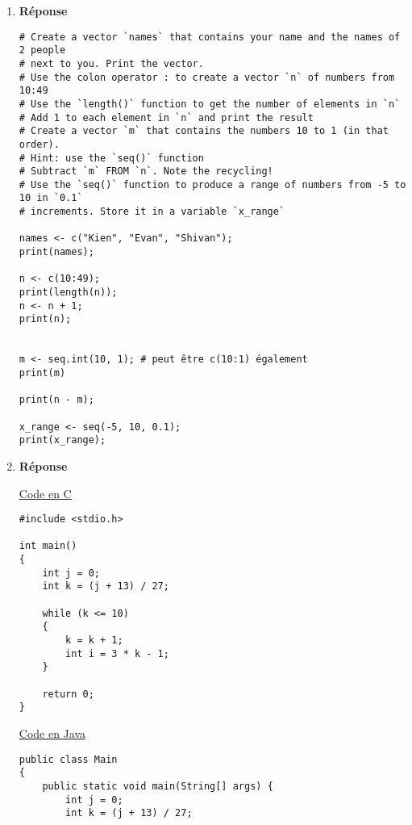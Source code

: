 \documentclass[12pt]{book}
\begin{document}
\newcommand{\reporttitle}{Devoir 3}
\newcommand{\reportauthorOne}{Kien Do}
\newcommand{\cidOne}{300163370}






\begin{enumerate}
    \item \textbf{Réponse}
\begin{verbatim}
# Create a vector `names` that contains your name and the names of 2 people
# next to you. Print the vector.
# Use the colon operator : to create a vector `n` of numbers from 10:49
# Use the `length()` function to get the number of elements in `n`
# Add 1 to each element in `n` and print the result
# Create a vector `m` that contains the numbers 10 to 1 (in that order).
# Hint: use the `seq()` function
# Subtract `m` FROM `n`. Note the recycling!
# Use the `seq()` function to produce a range of numbers from -5 to 10 in `0.1`
# increments. Store it in a variable `x_range`

names <- c("Kien", "Evan", "Shivan");
print(names);

n <- c(10:49);
print(length(n));
n <- n + 1;
print(n);


m <- seq.int(10, 1); # peut être c(10:1) également
print(m)

print(n - m);

x_range <- seq(-5, 10, 0.1);
print(x_range);
\end{verbatim}

\newpage
    \item \textbf{Réponse}
    
    \underline{Code en C}
\begin{verbatim}
#include <stdio.h>

int main()
{
    int j = 0;
    int k = (j + 13) / 27;
    
    while (k <= 10)
    {
        k = k + 1;
        int i = 3 * k - 1;
    }

    return 0;
}
\end{verbatim}
    \underline{Code en Java}
\begin{verbatim}
public class Main
{
    public static void main(String[] args) {
        int j = 0;
        int k = (j + 13) / 27;
        

\end{verbatim}
\end{enumerate}
\end{document}
